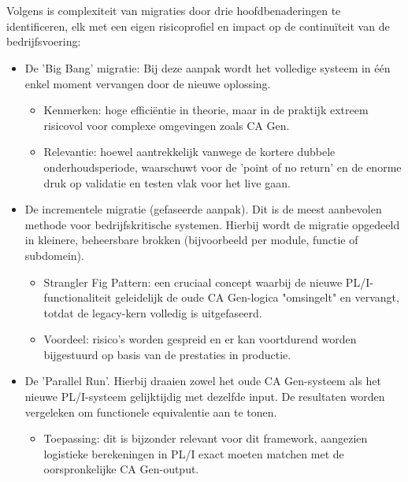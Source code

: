  \section{}%
 \label{sec:MIGRATIE}
 Volgens \textcite{Orosz2022} is complexiteit van migraties door drie hoofdbenaderingen te identificeren, elk met een eigen risicoprofiel en impact op de continuïteit van de bedrijfsvoering:
 \begin{itemize}
     \item De 'Big Bang' migratie: Bij deze aanpak wordt het volledige systeem in één enkel moment vervangen door de nieuwe oplossing.
     \begin{itemize}
         \item Kenmerken: hoge efficiëntie in theorie, maar in de praktijk extreem risicovol voor complexe omgevingen zoals CA Gen.
         \item Relevantie: hoewel aantrekkelijk vanwege de kortere dubbele onderhoudsperiode, waarschuwt \textcite{Orosz2022} voor de 'point of no return' en de enorme druk op validatie en testen vlak voor het live gaan.
     \end{itemize}
     \item De incrementele migratie (gefaseerde aanpak).
     Dit is de meest aanbevolen methode voor bedrijfskritische systemen. Hierbij wordt de migratie opgedeeld in kleinere, beheersbare brokken (bijvoorbeeld per module, functie of subdomein).
     \begin{itemize}
         \item Strangler Fig Pattern: een cruciaal concept waarbij de nieuwe PL/I-functionaliteit geleidelijk de oude CA Gen-logica "omsingelt" en vervangt, totdat de legacy-kern volledig is uitgefaseerd.
         \item Voordeel: risico's worden gespreid en er kan voortdurend  worden bijgestuurd op basis van de prestaties in productie.
     \end{itemize}
     \item De 'Parallel Run'.
     Hierbij draaien zowel het oude CA Gen-systeem als het nieuwe PL/I-systeem gelijktijdig met dezelfde input. De resultaten worden vergeleken om functionele equivalentie aan te tonen.
     \begin{itemize}
         \item Toepassing: dit is bijzonder relevant voor dit  framework, aangezien logistieke berekeningen in PL/I exact moeten matchen met de oorspronkelijke CA Gen-output.
     \end{itemize}
 \end{itemize}
 
